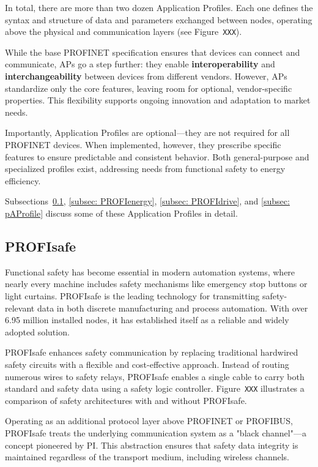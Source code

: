 \documentclass[conference]{IEEEtran}
\begin{document}
In total, there are more than two dozen Application Profiles. Each one defines the syntax and structure of data and parameters exchanged between nodes, operating above the physical and communication layers (see Figure~\texttt{XXX}).

While the base PROFINET specification ensures that devices can connect and communicate, APs go a step further: they enable \textbf{interoperability} and \textbf{interchangeability} between devices from different vendors. However, APs standardize only the core features, leaving room for optional, vendor-specific properties. This flexibility supports ongoing innovation and adaptation to market needs.

Importantly, Application Profiles are optional—they are not required for all PROFINET devices. When implemented, however, they prescribe specific features to ensure predictable and consistent behavior. Both general-purpose and specialized profiles exist, addressing needs from functional safety to energy efficiency.

Subsections~\ref{subsec:profisafe}, \ref{subsec: PROFIenergy}, \ref{subsec: PROFIdrive}, and \ref{subsec: pAProfile} discuss some of these Application Profiles in detail.


\subsection{PROFIsafe}
\label{subsec:profisafe}

Functional safety has become essential in modern automation systems, where nearly every machine includes safety mechanisms like emergency stop buttons or light curtains. PROFIsafe is the leading technology for transmitting safety-relevant data in both discrete manufacturing and process automation. With over 6.95 million installed nodes, it has established itself as a reliable and widely adopted solution.

PROFIsafe enhances safety communication by replacing traditional hardwired safety circuits with a flexible and cost-effective approach. Instead of routing numerous wires to safety relays, PROFIsafe enables a single cable to carry both standard and safety data using a safety logic controller. Figure~\texttt{XXX} illustrates a comparison of safety architectures with and without PROFIsafe.

Operating as an additional protocol layer above PROFINET or PROFIBUS, PROFIsafe treats the underlying communication system as a "black channel"—a concept pioneered by PI. This abstraction ensures that safety data integrity is maintained regardless of the transport medium, including wireless channels.
\end{document}
